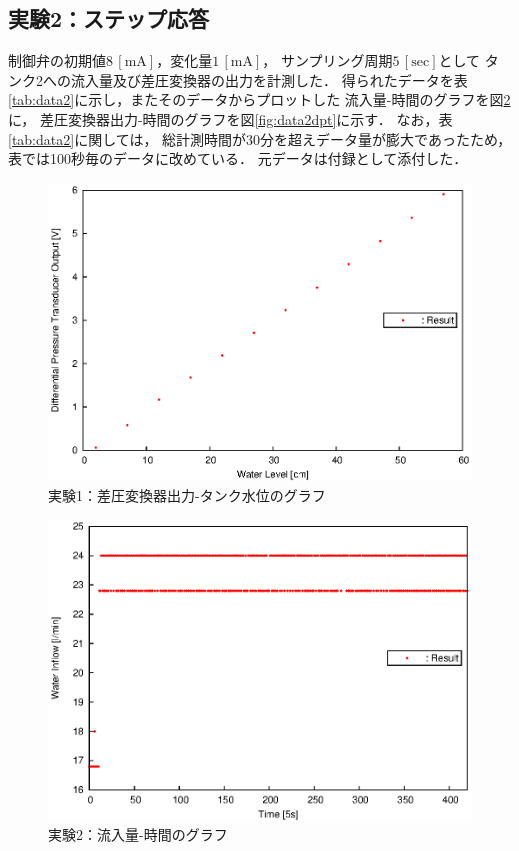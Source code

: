 \documentclass[11pt,a4paper]{jsarticle}
\begin{document}
  \subsection{実験2：ステップ応答}
    制御弁の初期値$8 \,\mathrm{[mA]}$，変化量$1 \,\mathrm{[mA]}$，
    サンプリング周期$5 \,\mathrm{[sec]}$として
    タンク2への流入量及び差圧変換器の出力を計測した．
    得られたデータを表\ref{tab:data2}に示し，またそのデータからプロットした
    流入量-時間のグラフを図\ref{fig:data2inflow}に，
    差圧変換器出力-時間のグラフを図\ref{fig:data2dpt}に示す．
    なお，表\ref{tab:data2}に関しては，
    総計測時間が30分を超えデータ量が膨大であったため，
    表では100秒毎のデータに改めている．
    元データは付録として添付した．

    

    \begin{figure}[H]
      \begin{center}
        \includegraphics[width=0.9\hsize]{./fig/data1.eps}
      \end{center}
      \caption{実験1：差圧変換器出力-タンク水位のグラフ}
      \label{fig:data1}
    \end{figure}

    \newpage
    

    \begin{figure}[H]
      \begin{center}
        \includegraphics[width=0.9\hsize]{./fig/data2inflow.eps}
      \end{center}
      \caption{実験2：流入量-時間のグラフ}
      \label{fig:data2inflow}
    \end{figure}
\end{document}
